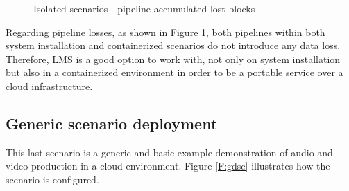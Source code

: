 \begin{figure}[!htb]
\begin{center}
\begin{subfigmatrix}{2}
    \end{subfigmatrix}
    \caption{Isolated scenarios - pipeline accumulated lost blocks}
    \label{F:isoaplb}
  \end{center}
\end{figure} 

\vbox{Regarding pipeline losses, as shown in Figure \ref{F:isoaplb}, both pipelines within both system installation and containerized scenarios do not introduce any data loss. Therefore, LMS is a good option to work with, not only on system installation but also in a containerized environment in order to be a portable service over a cloud infrastructure.}

\subsection{Generic scenario deployment}

This last scenario is a generic and basic example demonstration of audio and video production in a cloud environment. Figure \ref{F:gdsc} illustrates how the scenario is configured.


